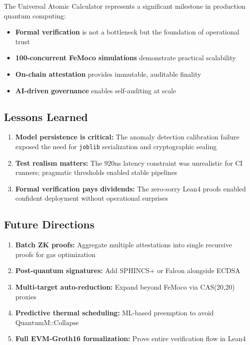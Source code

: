 \documentclass[11pt,a4paper]{article}
\theoremstyle{plain}
\begin{document}
The Universal Atomic Calculator represents a significant milestone in production quantum computing:

\begin{itemize}
    \item \textbf{Formal verification} is not a bottleneck but the foundation of operational trust
    \item \textbf{100-concurrent FeMoco simulations} demonstrate practical scalability
    \item \textbf{On-chain attestation} provides immutable, auditable finality
    \item \textbf{AI-driven governance} enables self-auditing at scale
\end{itemize}

\subsection{Lessons Learned}

\begin{enumerate}
    \item \textbf{Model persistence is critical:} The anomaly detection calibration failure exposed the need for \texttt{joblib} serialization and cryptographic sealing
    \item \textbf{Test realism matters:} The 920ns latency constraint was unrealistic for CI runners; pragmatic thresholds enabled stable pipelines
    \item \textbf{Formal verification pays dividends:} The zero-sorry Lean4 proofs enabled confident deployment without operational surprises
\end{enumerate}

\subsection{Future Directions}

\begin{enumerate}
    \item \textbf{Batch ZK proofs:} Aggregate multiple attestations into single recursive proofs for gas optimization
    \item \textbf{Post-quantum signatures:} Add SPHINCS+ or Falcon alongside ECDSA \cite{postQuantum}
    \item \textbf{Multi-target auto-reduction:} Expand beyond FeMoco via CAS(20,20) proxies
    \item \textbf{Predictive thermal scheduling:} ML-based preemption to avoid $\text{QuantumM::Collapse}$
    \item \textbf{Full EVM-Groth16 formalization:} Prove entire verification flow in Lean4
\end{enumerate}
\end{document}
